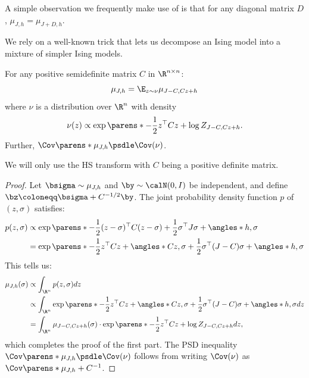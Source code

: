 \documentclass[11pt,letterpaper]{article}
\begin{document}
    \begin{observation}
        \label{obs:diag-invariant}
        A simple observation we frequently make use of is that for any diagonal matrix $D$, $\mu_{J, h} = \mu_{J+D, h}$.
    \end{observation}

    We rely on a well-known trick that lets us decompose an Ising model into a mixture of simpler Ising models.
    \begin{theorem}    \label{thm:HS}
        For any positive semidefinite matrix $C$ in $\R^{n\times n}$:
        \[
            \mu_{J, h} = \E_{z\sim\nu} \mu_{J-C, Cz+h}
        \]
        where $\nu$ is a distribution over $\R^n$ with density
        \[
            \nu(z) \propto \exp\parens*{-\frac{1}{2}z^{\top} C z + \log Z_{J-C, Cz+h}}.
        \]
        Further, $\Cov\parens*{\mu_{J, h}} \psdle \Cov(\nu)$.
    \end{theorem}
    We will only use the HS transform with $C$ being a positive definite matrix.
    \begin{proof}
        Let $\bsigma\sim\mu_{J, h}$ and $\by\sim\calN(0,I)$ be independent, and define $\bz \coloneqq \bsigma + C^{-1/2} \by$.
        The joint probability density function $p$ of $(z,\sigma)$ satisfies:
        \begin{align*}
            p(z,\sigma) &\propto \exp\parens*{-\frac{1}{2}(z-\sigma)^{\top} C (z-\sigma) + \frac{1}{2}\sigma^{\top}J\sigma + \angles*{h,\sigma}} \\
            &= \exp\parens*{ -\frac{1}{2} z^{\top} C z + \angles*{Cz,\sigma} + \frac{1}{2}\sigma^{\top} (J-C) \sigma + \angles*{h,\sigma} }
        \end{align*}
        This tells us:
        \begin{align*}
            \mu_{J,h}(\sigma) &\propto \int_{\R^n} p(z,\sigma) dz \\
            &\propto \int_{\R^n} \exp\parens*{ -\frac{1}{2} z^{\top} C z + \angles*{Cz,\sigma} + \frac{1}{2}\sigma^{\top} (J-C) \sigma + \angles*{h,\sigma} } dz \\
            &= \int_{\R^n} \mu_{J-C, Cz+h}(\sigma) \cdot \exp\parens*{ -\frac{1}{2}z^{\top}Cz + \log Z_{J-C, Cz+h} } dz,
        \end{align*}
        which completes the proof of the first part.
        The PSD inequality $\Cov\parens*{\mu_{J, h}} \psdle \Cov(\nu)$ follows from writing $\Cov(\nu)$ as $\Cov\parens*{\mu_{J, h}} + C^{-1}$.
    \end{proof}
\end{document}
